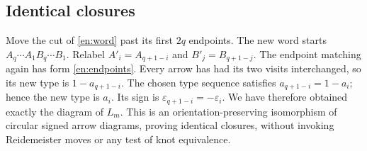 \documentclass[12pt]{amsart}
\theoremstyle{definition}
\theoremstyle{remark}
\numberwithin{equation}{section}
\newcommand{\eps}{\varepsilon}
\begin{document}
\subsection{Identical closures}
Move the cut of \eqref{en:word} past its first $2q$ endpoints. The new
word starts $A_q\cdots A_1 B_q\cdots B_1$. Relabel
$A'_i=A_{q+1-i}$ and $B'_j=B_{q+1-j}$. The endpoint matching again has
form \eqref{en:endpoints}. Every arrow has had its two visits interchanged,
so its new type is $1-a_{q+1-i}$. The chosen type sequence satisfies
$a_{q+1-i}=1-a_i$; hence the new type is $a_i$. Its sign is
$\eps_{q+1-i}=-\eps_i$. We have therefore obtained exactly the diagram
of $L_m$. This is an orientation-preserving isomorphism of circular
signed arrow diagrams, proving identical closures, without invoking
Reidemeister moves or any test of knot equivalence.
\end{document}
